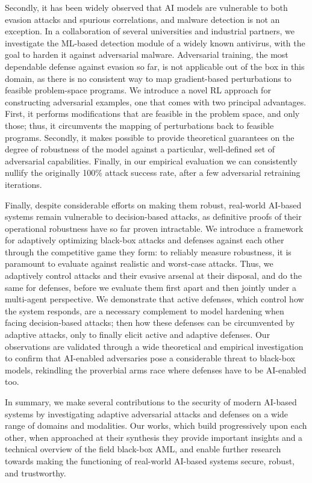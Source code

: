 Secondly, it has been widely observed that \gls{AI} models are vulnerable to both evasion attacks and spurious correlations, and malware detection is not an exception.
In a collaboration of several universities and industrial partners, we investigate the \gls{ML}-based detection module of a widely known antivirus, with the goal to harden it against adversarial malware.
Adversarial training, the most dependable defense against evasion so far, is not applicable out of the box in this domain, as there is no consistent way to map gradient-based perturbations to feasible problem-space programs.
We introduce a novel \gls{RL} approach for constructing adversarial examples, one that comes with two principal advantages.
First, it performs modifications that are feasible in the problem space, and only those; thus, it circumvents the mapping of perturbations back to feasible programs.
Secondly, it makes possible to provide theoretical guarantees on the degree of robustness of the model against a particular, well-defined set of adversarial capabilities.
Finally, in our empirical evaluation we can consistently nullify the originally 100\% attack success rate, after a few adversarial retraining iterations.

Finally, despite considerable efforts on making them robust, real-world AI-based systems remain vulnerable to decision-based attacks, as definitive proofs of their operational robustness have so far proven intractable.
We introduce a framework for adaptively optimizing black-box attacks and defenses against each other through the competitive game they form: to reliably measure robustness, it is paramount to evaluate against realistic and worst-case attacks.
Thus, we adaptively control attacks and their evasive arsenal at their disposal, and do the same for defenses, before we evaluate them first apart and then jointly under a multi-agent perspective.
We demonstrate that active defenses, which control how the system responds, are a necessary complement to model hardening when facing decision-based attacks; then how these defenses can be circumvented by adaptive attacks, only to finally elicit active and adaptive defenses.
Our observations are validated through a wide theoretical and empirical investigation to confirm that AI-enabled adversaries pose a considerable threat to black-box models, rekindling the proverbial arms race where defenses have to be AI-enabled too.

In summary, we make several contributions to the security of modern AI-based systems by investigating adaptive adversarial attacks and defenses on a wide range of domains and modalities.
Our works, which build progressively upon each other, when approached at their synthesis they provide important insights and a technical overview of the field black-box \gls{AML}, and enable further research towards making the functioning of real-world \gls{AI}-based systems secure, robust, and trustworthy.

\cleardoublepage

